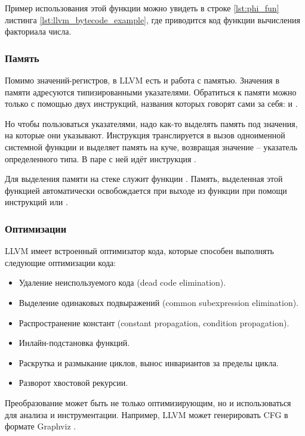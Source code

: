 Пример использования этой функции можно увидеть в строке \ref{lst:phi_fun} листинга \ref{lst:llvm_bytecode_example},
где приводится код функции вычисления факториала числа.

\subsubsection{Память}

Помимо значений-регистров, в LLVM есть и работа с памятью. Значения в памяти адресуются типизированными указателями.
Обратиться к памяти можно только с помощью двух инструкций, названия которых говорят сами за себя:  и .

Но чтобы пользоваться указателями, надо как-то выделять память под значения, на которые они указывают.
Инструкция  транслируется в вызов одноименной системной функции и выделяет память на куче, возвращая значение -- указатель
определенного типа. В паре с ней идёт инструкция .

Для выделения памяти на стеке служит функции .
Память, выделенная этой функцией автоматически освобождается при выходе из функции при помощи инструкций  или .

\subsubsection{Оптимизации}

LLVM имеет встроенный оптимизатор кода, которые способен выполнять следующие оптимизации кода:
\begin{itemize}
    \item Удаление неиспользуемого кода (dead code elimination).
    \item Выделение одинаковых подвыражений (common subexpression elimination).
    \item Распространение констант (constant propagation, condition propagation).
    \item Инлайн-подстановка функций.
    \item Раскрутка и размыкание циклов, вынос инвариантов за пределы цикла.
    \item Разворот хвостовой рекурсии.
\end{itemize}

Преобразование может быть не только оптимизирующим, но и использоваться для анализа и инструментации. Например, LLVM может
генерировать CFG в формате Graphviz \cite{graphviz}.

